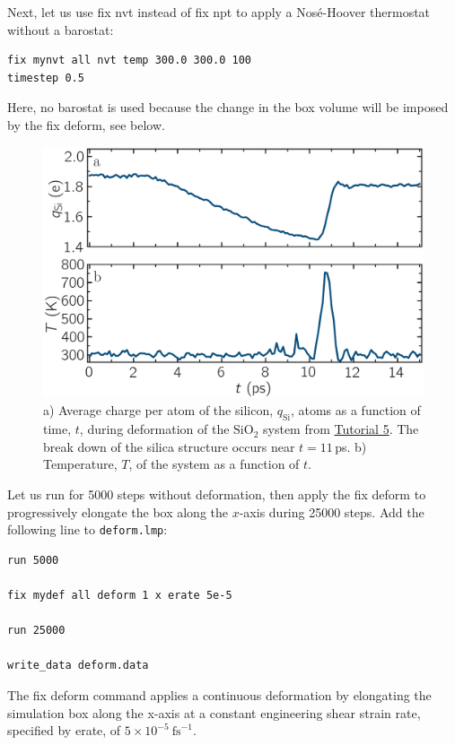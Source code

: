\documentclass[9pt,tutorial]{livecoms}
\newcommand{\lmpcmd}[1]{\hspace{0pt}\colorbox{listing}{\textcolor{command}{\small{#1}}}\hspace{0pt}} %
\newcommand{\flecmd}[1]{\textcolor{command}{\texttt{#1}}} %
\begin{document}
Next, let us use \lmpcmd{fix nvt} instead of \lmpcmd{fix npt} to apply a
Nosé-Hoover thermostat without a barostat:
\begin{lstlisting}
fix mynvt all nvt temp 300.0 300.0 100
timestep 0.5
\end{lstlisting}
Here, no barostat is used because the change in the box volume will be imposed
by the \lmpcmd{fix deform}, {\color{blue}see below}.

\begin{figure}
\includegraphics[width=\linewidth]{SIO-deformed-charge}
\caption{a) Average charge per atom of the silicon, $q_\text{Si}$, atoms as
a function of time, $t$, during deformation of the $\text{SiO}_2$ system
from \hyperref[reactive-silicon-dioxide-label]{Tutorial 5}. The break down of the
silica structure occurs near $t = 11$\,ps.  b) Temperature, $T$, of the
system as a function of $t$.}
\label{fig:SIO-deformed-charge}
\end{figure}

Let us run for 5000 steps without deformation, then apply the \lmpcmd{fix deform}
to progressively elongate the box along the $x$-axis during 25000 steps.  Add
the following line to \flecmd{deform.lmp}:
\begin{lstlisting}
run 5000

fix mydef all deform 1 x erate 5e-5

run 25000

write_data deform.data
\end{lstlisting}
{\color{blue}The \lmpcmd{fix deform} command applies a continuous deformation
by elongating the simulation box along the x-axis at a constant engineering
shear strain rate, specified by \lmpcmd{erate}, of $5 \times 10^{-5}~\text{fs}^{-1}$.}
\end{document}
